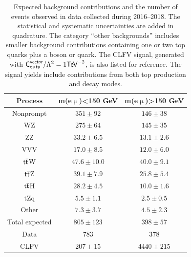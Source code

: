\begin{table}[th]
\sffamily
\centering
\caption{Expected background contributions and the number of events observed in data collected during 2016--2018. The statistical and systematic uncertainties are added in quadrature. The category ``other backgrounds'' includes smaller background contributions containing one or two top quarks plus a boson or quark. The \ac{CLFV} signal, generated with $\textsf{C}^{\textsf{vector}}_{\textsf{e}\upmu\textsf{t{u}}}/\mathrm{\Lambda}^2=1\textsf{TeV}^{-2}$, is also listed for reference. The signal yields include contributions from both top production and decay modes.}
\begin{tabular}{ccc}
\toprule
Process & m(e$\upmu$)<150 GeV & m(e$\upmu$)>150 GeV \\
\midrule
Nonprompt & $351\pm92$ & $146\pm38$\\
WZ & $275\pm64$ & $145\pm35$\\
ZZ & $33.2\pm6.5$ & $13.1\pm2.6$\\
VVV & $17.0\pm8.5$ & $12.0\pm6.0$\\
$\textsf{t}\overline{\textsf{t}}$W & $47.6\pm10.0$ & $40.0\pm9.1$\\
$\textsf{t}\overline{\textsf{t}}$Z & $39.1\pm7.9$ & $25.8\pm5.4$\\
$\textsf{t}\overline{\textsf{t}}$H & $28.2\pm4.5$ & $10.0\pm1.6$\\
tZq & $5.5\pm1.1$ & $2.5\pm0.5$\\
Other & $7.3\pm3.7$ & $4.5\pm2.3$\\
Total expected & $805\pm123$ & $398\pm57$\\
Data & 783 & 378\\
\midrule
CLFV & $207\pm15$ & $4440\pm215$\\
\bottomrule
\end{tabular}
\label{tab:eventcount}
\end{table}
